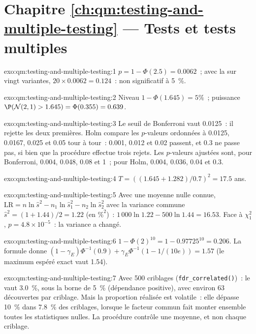 \section*{Chapitre \ref{ch:qm:testing-and-multiple-testing} --- Tests et tests multiples}

\begin{solution}{exo:qm:testing-and-multiple-testing:1}
$p = 1 - \Phi(2.5) = 0.0062$~; avec la  sur vingt variantes, $20 \times 0.0062 = 0.124$~: non significatif à 5~\%.
\end{solution}

\begin{solution}{exo:qm:testing-and-multiple-testing:2}
Niveau $1 - \Phi(1.645) = 5\%$~; puissance $\P(\mathcal N(2, 1) > 1.645) = \Phi(0.355) = 0.639$.
\end{solution}

\begin{solution}{exo:qm:testing-and-multiple-testing:3}
Le seuil de Bonferroni vaut 0.0125~: il rejette les deux premières. Holm compare les $p$-valeurs ordonnées à 0.0125, 0.0167, 0.025 et
0.05 tour à tour~: 0.001, 0.012 et 0.02 passent, et 0.3 ne passe pas, si bien que la procédure effectue trois rejets. Les $p$-valeurs ajustées sont, pour
Bonferroni, 0.004, 0.048, 0.08 et 1~; pour Holm, 0.004, 0.036, 0.04 et 0.3.
\end{solution}

\begin{solution}{exo:qm:testing-and-multiple-testing:4}
$T = ((1.645 + 1.282)/0.7)^2 = 17.5$ ans.
\end{solution}

\begin{solution}{exo:qm:testing-and-multiple-testing:5}
Avec une moyenne nulle connue, $\mathrm{LR} = n\ln\hat s^2 - n_1\ln\hat s_1^2 - n_2\ln\hat s_2^2$ avec la variance commune $\hat s^2 = (1 + 1.44)/2 = 1.22$ (en
$\%^2$)~: $1\,000\ln1.22 - 500\ln1.44 = 16.53$. Face à $\chi^2_1$, $p = 4.8 \times 10^{-5}$~: la variance a changé.
\end{solution}

\begin{solution}{exo:qm:testing-and-multiple-testing:6}
$1 - \Phi(2)^{10} = 1 - 0.97725^{10} = 0.206$. La formule donne $(1 - \gamma_E)\Phi^{-1}(0.9) + \gamma_E\Phi^{-1}(1 - 1/(10e)) = 1.57$
(le maximum espéré exact vaut 1.54).
\end{solution}

\begin{solution}{exo:qm:testing-and-multiple-testing:7}
Avec 500 criblages (\texttt{fdr\_correlated()})~: le  vaut 3.0~\%, sous la borne de 5~\% (dépendance positive), avec
environ 63 découvertes par criblage. Mais la proportion réalisée est volatile~: elle dépasse 10~\% dans 7.8~\% des criblages, lorsque le facteur commun
fait monter ensemble toutes les statistiques nulles. La procédure contrôle une moyenne, et non chaque criblage.
\end{solution}

